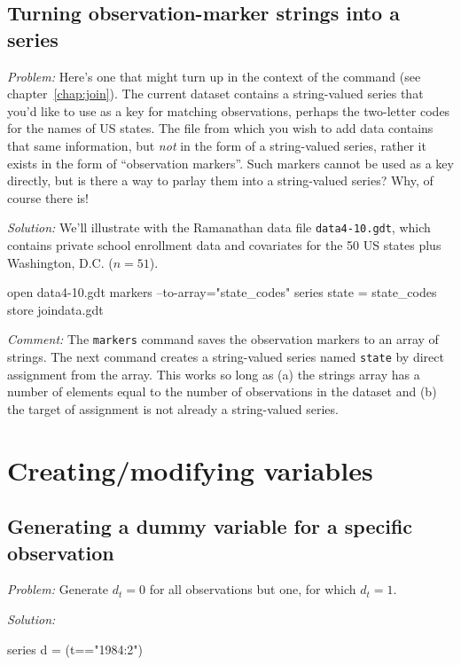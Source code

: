 \subsection{Turning observation-marker strings into a series}

\emph{Problem:} Here's one that might turn up in the context of the
 command (see chapter~\ref{chap:join}). The current dataset
contains a string-valued series that you'd like to use as a key for
matching observations, perhaps the two-letter codes for the names of
US states. The file from which you wish to add data contains that same
information, but \textit{not} in the form of a string-valued series,
rather it exists in the form of ``observation markers''. Such markers
cannot be used as a key directly, but is there a way to parlay them
into a string-valued series? Why, of course there is!

\emph{Solution:}
We'll illustrate with the Ramanathan data file \texttt{data4-10.gdt},
which contains private school enrollment data and covariates for the
50 US states plus Washington, D.C. ($n = 51$).
\begin{code}
open data4-10.gdt
markers --to-array="state_codes"
series state = state_codes
store joindata.gdt
\end{code}

\emph{Comment:} The \texttt{markers} command saves the observation
markers to an array of strings. The next command creates a string-valued
series named \texttt{state} by direct assignment from the array. This
works so long as (a) the strings array has a number of elements equal to
the number of observations in the dataset and (b) the target of
assignment is not already a string-valued series.

\section{Creating/modifying variables}

\subsection{Generating a dummy variable for a specific observation}

\emph{Problem:} Generate $d_t = 0$ for all observations but one, for
which $d_t = 1$.

\emph{Solution:}
\begin{code}
  series d = (t=="1984:2")
\end{code}

